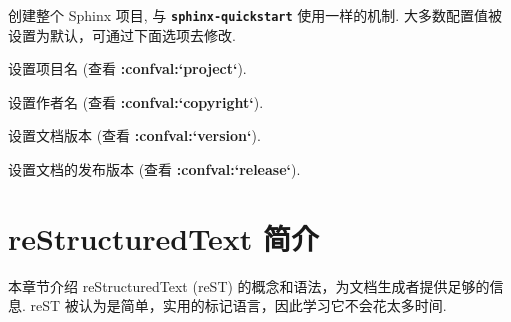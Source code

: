 \documentclass[letterpaper,10pt,english]{sphinxmanual}
\begin{document}
\begin{fulllineitems}
\label{invocation:cmdoption-sphinx-apidoc-F}
创建整个 Sphinx 项目, 与 \textbf{\texttt{sphinx-quickstart}} 使用一样的机制.
大多数配置值被设置为默认，可通过下面选项去修改.

\end{fulllineitems}


\begin{fulllineitems}
\label{invocation:cmdoption-sphinx-apidoc-H}
设置项目名 (查看 {\color{red}\bfseries{}:confval:{}`project{}`}).

\end{fulllineitems}


\begin{fulllineitems}
\label{invocation:cmdoption-sphinx-apidoc-A}
设置作者名 (查看 {\color{red}\bfseries{}:confval:{}`copyright{}`}).

\end{fulllineitems}


\begin{fulllineitems}
\label{invocation:cmdoption-sphinx-apidoc-V}
设置文档版本 (查看 {\color{red}\bfseries{}:confval:{}`version{}`}).

\end{fulllineitems}


\begin{fulllineitems}
\label{invocation:cmdoption-sphinx-apidoc-R}
设置文档的发布版本 (查看 {\color{red}\bfseries{}:confval:{}`release{}`}).

\end{fulllineitems}



\chapter{reStructuredText 简介}
\label{rest:restructuredtext}\label{rest:rst-primer}\label{rest::doc}
本章节介绍 reStructuredText (reST) 的概念和语法，为文档生成者提供足够的信息.
reST 被认为是简单，实用的标记语言，因此学习它不会花太多时间.
\end{document}
